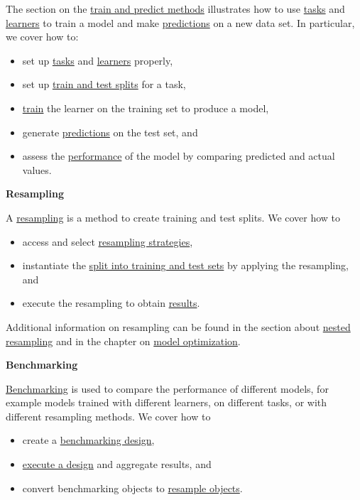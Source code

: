 \documentclass[]{scrbook}
\providecommand{\tightlist}{%
  \setlength{\itemsep}{0pt}\setlength{\parskip}{0pt}}
\begin{document}
The section on the \protect\hyperlink{train-predict}{train and predict methods} illustrates how to use \protect\hyperlink{tasks}{tasks} and \protect\hyperlink{learners}{learners} to train a model and make \protect\hyperlink{predicting}{predictions} on a new data set.
In particular, we cover how to:

\begin{itemize}
\tightlist
\item
  set up \protect\hyperlink{train-predict-objects}{tasks} and \protect\hyperlink{train-predict-objects}{learners} properly,
\item
  set up \protect\hyperlink{split-data}{train and test splits} for a task,
\item
  \protect\hyperlink{training}{train} the learner on the training set to produce a model,
\item
  generate \protect\hyperlink{predicting}{predictions} on the test set, and
\item
  assess the \protect\hyperlink{measure}{performance} of the model by comparing predicted and actual values.
\end{itemize}

\textbf{Resampling}

A \protect\hyperlink{resampling}{resampling} is a method to create training and test splits.
We cover how to

\begin{itemize}
\tightlist
\item
  access and select \protect\hyperlink{resampling-settings}{resampling strategies},
\item
  instantiate the \protect\hyperlink{resampling-inst}{split into training and test sets} by applying the resampling, and
\item
  execute the resampling to obtain \protect\hyperlink{resampling-exec}{results}.
\end{itemize}

Additional information on resampling can be found in the section about \protect\hyperlink{nested-resampling}{nested resampling} and in the chapter on \protect\hyperlink{optimization}{model optimization}.

\textbf{Benchmarking}

\protect\hyperlink{benchmarking}{Benchmarking} is used to compare the performance of different models, for example models trained with different learners, on different tasks, or with different resampling methods.
We cover how to

\begin{itemize}
\tightlist
\item
  create a \protect\hyperlink{bm-design}{benchmarking design},
\item
  \protect\hyperlink{bm-exec}{execute a design} and aggregate results, and
\item
  convert benchmarking objects to \protect\hyperlink{bm-resamp}{resample objects}.
\end{itemize}
\end{document}
